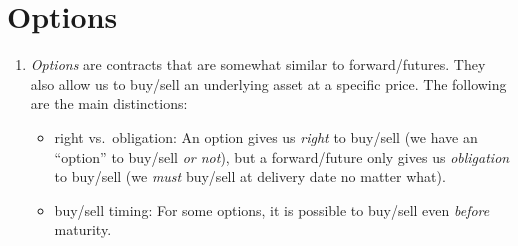 \section{Options}
\label{sect:options}
\begin{enumerate}
\item \emph{Options} are contracts that are somewhat similar to
forward/futures. They also allow us to buy/sell an underlying asset
 at a specific price. The following are the main
distinctions:
\begin{itemize}
\item right vs.\ obligation: An option gives us \emph{right} to buy/sell
 (we have an ``option'' to buy/sell 
\emph{or not}), but a forward/future only gives us \emph{obligation} to buy/sell
 (we \emph{must} buy/sell  at delivery date
no matter what).
\item buy/sell timing: For some options, it is possible to buy/sell
 even \emph{before} maturity.
\end{itemize}
\end{enumerate}
